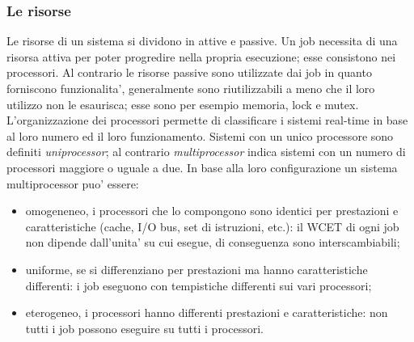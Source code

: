 \subsubsection{Le risorse}
\label{sec:overviewRM}

Le risorse di un sistema si dividono in attive e passive. Un job necessita di una risorsa attiva per poter progredire nella propria esecuzione; esse consistono nei processori. Al contrario le risorse passive sono utilizzate dai job in quanto forniscono funzionalita', generalmente sono riutilizzabili a meno che il loro utilizzo non le esaurisca; esse sono per esempio memoria, lock e mutex.\\

L'organizzazione dei processori permette di classificare i sistemi real-time in base al loro numero ed il loro funzionamento. Sistemi con un unico processore sono definiti \textit{uniprocessor}; al contrario \textit{multiprocessor} indica sistemi con un numero di processori maggiore o uguale a due. In base alla loro configurazione un sistema multiprocessor puo' essere:

\begin{itemize}
	\item omogeneneo, i processori che lo compongono sono identici per prestazioni e caratteristiche (cache, I/O bus, set di istruzioni, etc.): il WCET di ogni job non dipende dall'unita' su cui esegue, di conseguenza sono interscambiabili;
	\item uniforme, se si differenziano per prestazioni ma hanno caratteristiche differenti: i job eseguono con tempistiche differenti sui vari processori;
	\item eterogeneo, i processori hanno differenti prestazioni e caratteristiche: non tutti i job possono eseguire su tutti i processori.
\end{itemize}

